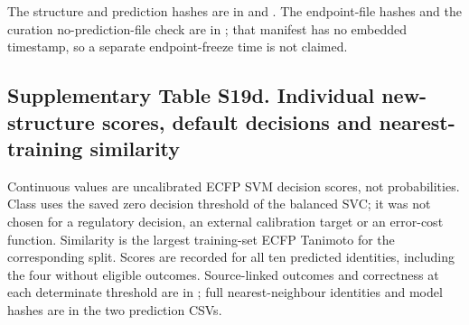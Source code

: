 The structure and prediction hashes are in  and . The endpoint-file hashes and the curation no-prediction-file check are in ; that manifest has no embedded timestamp, so a separate endpoint-freeze time is not claimed.

\subsection*{Supplementary Table S19d. Individual new-structure scores, default decisions and nearest-training similarity}

Continuous values are uncalibrated ECFP SVM decision scores, not probabilities. Class uses the saved zero decision threshold of the balanced SVC; it was not chosen for a regulatory decision, an external calibration target or an error-cost function. Similarity is the largest training-set ECFP Tanimoto for the corresponding split. Scores are recorded for all ten predicted identities, including the four without eligible outcomes. Source-linked outcomes and correctness at each determinate threshold are in ; full nearest-neighbour identities and model hashes are in the two prediction CSVs.

\begingroup\footnotesize\setlength{\tabcolsep}{4pt}

